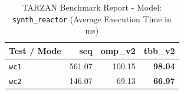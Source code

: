 \begin{table}[htbp]
\centering
\caption{TARZAN Benchmark Report - Model: \texttt{synth\_reactor} (Average Execution Time in ms)}
\label{tab:synth_reactor_benchmark}
\begin{tabular}{lrrr}
\toprule
\textbf{Test / Mode} & \textbf{seq} & \textbf{omp\_v2} & \textbf{tbb\_v2} \\
\midrule
\texttt{wc1} & 561.07 & 100.15 & \textbf{98.04} \\
\texttt{wc2} & 146.07 & 69.13 & \textbf{66.97} \\
\bottomrule
\end{tabular}
\end{table}